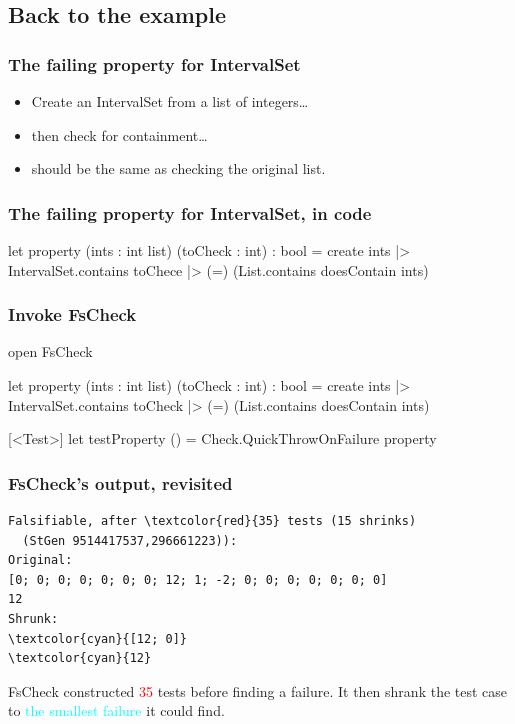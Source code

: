 \documentclass{beamer}
\begin{document}
\subsection{Back to the example}

\begin{frame}
\frametitle{The failing property for IntervalSet}
\begin{itemize}
\item Create an IntervalSet from a list of integers\dots
\item then check for containment\dots
\item should be the same as checking the original list.
\end{itemize}
\end{frame}

\begin{frame}[fragile]
\frametitle{The failing property for IntervalSet, in code}
\begin{fslisting}
let property (ints : int list) (toCheck : int) : bool =
    create ints
    |> IntervalSet.contains toChece
    |> (=) (List.contains doesContain ints)
\end{fslisting}

\end{frame}

\begin{frame}[fragile]
\frametitle{Invoke FsCheck}
\begin{fslisting}
open FsCheck

let property (ints : int list) (toCheck : int) : bool =
    create ints
    |> IntervalSet.contains toCheck
    |> (=) (List.contains doesContain ints)

[<Test>]
let testProperty () =
    Check.QuickThrowOnFailure property
\end{fslisting}

\end{frame}

\begin{frame}[fragile]
\frametitle{FsCheck's output, revisited}
\begin{Verbatim}[commandchars=\\\{\}]
Falsifiable, after \textcolor{red}{35} tests (15 shrinks)
  (StGen 9514417537,296661223)):
Original:
[0; 0; 0; 0; 0; 0; 0; 12; 1; -2; 0; 0; 0; 0; 0; 0; 0]
12
Shrunk:
\textcolor{cyan}{[12; 0]}
\textcolor{cyan}{12}
\end{Verbatim}

\hfill \break

FsCheck constructed \textcolor{red}{35} tests before finding a failure.
It then shrank the test case to \textcolor{cyan}{the smallest failure} it could find.
\end{frame}
\end{document}
